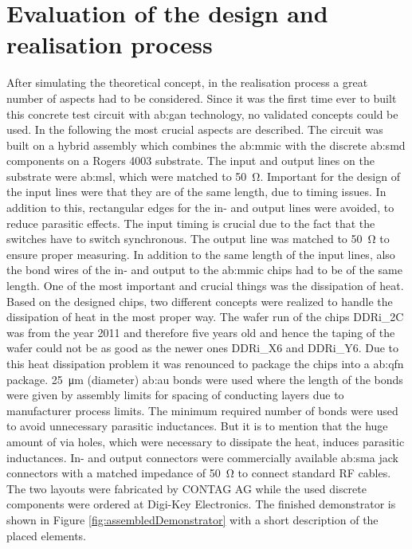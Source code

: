 \section{Evaluation of the design and realisation process}
After simulating the theoretical concept, in the realisation process a great number of aspects had to be considered.
Since it was the first time ever to built this concrete test circuit with \gls{ab:gan} technology, no validated concepts could be used.
In the following the most crucial aspects are described.
The circuit was built on a hybrid assembly which combines the \gls{ab:mmic} with the discrete \gls{ab:smd} components on a Rogers 4003 substrate.
The input and output lines on the substrate were \gls{ab:msl}, which were matched to \SI{50}{\ohm}.
Important for the design of the input lines were that they are of the same length, due to timing issues.
In addition to this, rectangular edges for the in- and output lines were avoided, to reduce parasitic effects.
The input timing is crucial due to the fact that the switches have to switch synchronous.
The output line was matched to \SI{50}{\ohm} to ensure proper measuring.
In addition to the same length of the input lines, also the bond wires of the in- and output to the \gls{ab:mmic} chips had to be of the same length.
One of the most important and crucial things was the dissipation of heat.
Based on the designed chips, two different concepts were realized to handle the dissipation of heat in the most proper way.
The wafer run of the chips DDRi\_2C was from the year 2011 and therefore five years old and hence the taping of the wafer could not be as good as the newer ones DDRi\_X6 and DDRi\_Y6.
Due to this heat dissipation problem it was renounced to package the chips into a \gls{ab:qfn} package.
\SI{25}{\micro \metre} (diameter) \gls{ab:au} bonds were used where the length of the bonds were given by assembly limits for spacing of conducting layers due to manufacturer process limits.
The minimum required number of bonds were used to avoid unnecessary parasitic inductances. 
But it is to mention that the huge amount of via holes, which were necessary to dissipate the heat, induces parasitic inductances.
In- and output connectors were commercially available \gls{ab:sma} jack connectors with a matched impedance of \SI{50}{\ohm} to connect standard RF cables.\\
The two layouts were fabricated by CONTAG AG while the used discrete components were ordered at Digi-Key Electronics.
The finished demonstrator is shown in Figure \ref{fig:assembledDemonstrator} with a short description of the placed elements.

